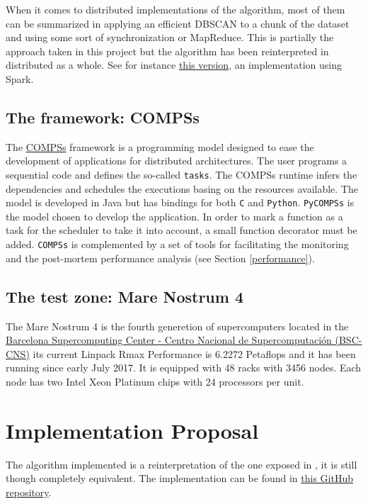 \documentclass[10pt,journal,compsoc]{IEEEtran}
\begin{document}
When it comes to distributed implementations of the algorithm, most of them can be summarized in applying an efficient DBSCAN to a chunk of the dataset and using some sort of synchronization or MapReduce. This is partially the approach taken in this project but the algorithm has been reinterpreted in distributed as a whole. See for instance \href{https://github.com/bwoneill/pypardis}{this version}, an implementation using Spark.


\subsection{The framework: COMPSs} \label{compss_framework}

The \href{https://www.bsc.es/research-and-development/software-and-apps/software-list/comp-superscalar}{COMPSs} framework is a programming model designed to ease the development of applications for distributed architectures. The user programs a sequential code and defines the so-called \texttt{tasks}. The COMPSs runtime infers the dependencies and schedules the executions basing on the resources available. The model is developed in Java but has bindings for both \texttt{C} and \texttt{Python}. \texttt{PyCOMPSs} is the model chosen to develop the application. In order to mark a function as a task for the scheduler to take it into account, a small function decorator must be added. \texttt{COMPSs} is complemented by a set of tools for facilitating the monitoring and the post-mortem performance analysis (see Section \ref{performance}).

\subsection{The test zone: Mare Nostrum 4} \label{the_machine}

The Mare Nostrum 4 is the fourth generetion of supercomputers located in the \href{https://www.bsc.es}{Barcelona Supercomputing Center - Centro Nacional de Supercomputación (BSC-CNS)} its current Linpack Rmax Performance is 6.2272 Petaflops and it has been running since early July 2017. It is equipped with 48 racks with 3456 nodes. Each node has two Intel Xeon Platinum chips with 24 processors per unit.


\section{Implementation Proposal}
The algorithm implemented is a reinterpretation of the one exposed in \cite{ReferencePaper}, it is still though completely equivalent. The implementation can be found in \href{https://github.com/csegarragonz/DBSCAN-pyCOMPSs}{this GitHub repository}.
\end{document}
